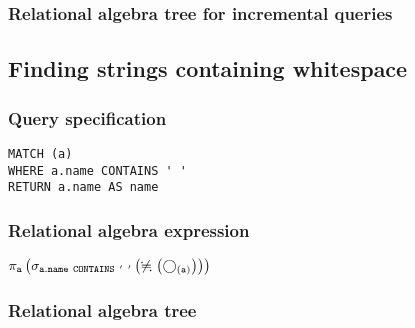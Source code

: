 \subsubsection*{Relational algebra tree for incremental queries}


\subsection{Finding strings containing whitespace}

\subsubsection*{Query specification}

\begin{lstlisting}
MATCH (a)
WHERE a.name CONTAINS ' '
RETURN a.name AS name
\end{lstlisting}

\subsubsection*{Relational algebra expression}

$\projection{\var{a}} \left(\selection{\mathtt{a.name~CONTAINS~'~'}} \left(\alldifferent{} \left(\getvertices{a}{}\right)\right)\right)$

\subsubsection*{Relational algebra tree}


